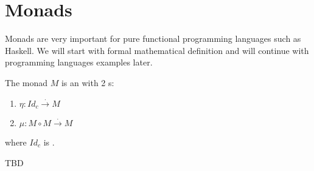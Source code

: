 \chapter{Monads}

Monads are very important for pure functional programming languages
such as Haskell. We will start with formal mathematical definition and
will continue with programming languages examples later.

\begin{definition}[Monad]
  \label{def:monad}
  The monad $M$ is an  with 2
  s:
  \begin{enumerate}
  \item $\eta: Id_c \xrightarrow{.} M$
  \item $\mu: M \circ M \xrightarrow{.} M$
  \end{enumerate}
  where $Id_c$ is .
\end{definition}




TBD
